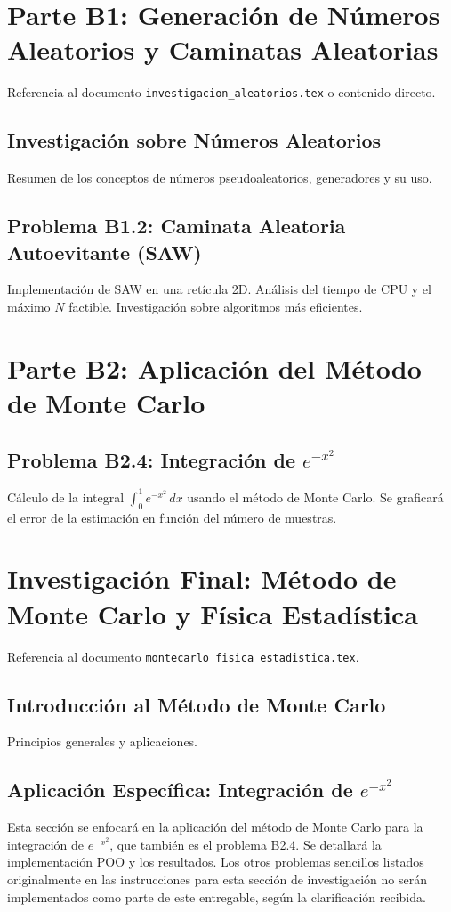\documentclass[11pt,a4paper]{article}
\begin{document}
\section{Parte B1: Generación de Números Aleatorios y Caminatas Aleatorias}
\label{sec:parte_b1}
Referencia al documento \texttt{investigacion\_aleatorios.tex} o contenido directo.
\subsection{Investigación sobre Números Aleatorios}
Resumen de los conceptos de números pseudoaleatorios, generadores y su uso.
\subsection{Problema B1.2: Caminata Aleatoria Autoevitante (SAW)}
Implementación de SAW en una retícula 2D. Análisis del tiempo de CPU y el máximo $N$ factible. Investigación sobre algoritmos más eficientes.

\section{Parte B2: Aplicación del Método de Monte Carlo}
\label{sec:parte_b2}
\subsection{Problema B2.4: Integración de $e^{-x^2}$}
Cálculo de la integral $\displaystyle\int_0^1 e^{-x^2}\,dx$ usando el método de Monte Carlo. Se graficará el error de la estimación en función del número de muestras.

\section{Investigación Final: Método de Monte Carlo y Física Estadística}
\label{sec:investigacion_montecarlo}
Referencia al documento \texttt{montecarlo\_fisica\_estadistica.tex}.
\subsection{Introducción al Método de Monte Carlo}
Principios generales y aplicaciones.
\subsection{Aplicación Específica: Integración de $e^{-x^2}$}
Esta sección se enfocará en la aplicación del método de Monte Carlo para la integración de $e^{-x^2}$, que también es el problema B2.4.
Se detallará la implementación POO y los resultados. Los otros problemas sencillos listados originalmente en las instrucciones para esta sección de investigación no serán implementados como parte de este entregable, según la clarificación recibida.
\end{document}
